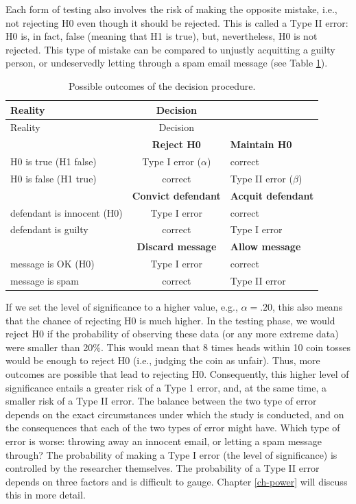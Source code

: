 \documentclass[
]{book}
\begin{document}
Each form of testing also involves the risk of making the opposite mistake, i.e., not rejecting H0 even though it should be rejected. This is called a Type II error: H0 is, in fact, false (meaning that H1 is true), but, nevertheless, H0 is not rejected. This type of mistake can be compared to unjustly acquitting a guilty person, or undeservedly letting through a spam email message (see Table \ref{tab:H0H1outcomes}).

\begin{longtable}[]{@{}lcl@{}}
\caption{\label{tab:H0H1outcomes} Possible outcomes of the decision procedure.}\tabularnewline
\toprule
Reality & Decision & \\
\midrule
\endfirsthead
\toprule
Reality & Decision & \\
\midrule
\endhead
& \textbf{Reject H0} & \textbf{Maintain H0} \\
H0 is true (H1 false) & Type I error (\(\alpha\)) & correct \\
H0 is false (H1 true) & correct & Type II error (\(\beta\)) \\
& \textbf{Convict defendant} & \textbf{Acquit defendant} \\
defendant is innocent (H0) & Type I error & correct \\
defendant is guilty & correct & Type I error \\
& \textbf{Discard message} & \textbf{Allow message} \\
message is OK (H0) & Type I error & correct \\
message is spam & correct & Type II error \\
\bottomrule
\end{longtable}

If we set the level of significance to a higher value, e.g., \(\alpha = .20\), this also means that the chance of rejecting H0 is much higher. In the testing phase, we would reject H0 if the probability of observing these data (or any more extreme data) were smaller than 20\%. This would mean that 8 times heads within 10 coin tosses would be enough to reject H0 (i.e., judging the coin as unfair). Thus, more outcomes are possible that lead to rejecting H0. Consequently, this higher level of significance entails a greater risk of a Type 1 error, and, at the same time, a smaller risk of a Type II error. The balance between the two type of error depends on the exact circumstances under which the study is conducted, and on the consequences that each of the two types of error might have. Which type of error is worse: throwing away an innocent email, or letting a spam message through? The probability of making a Type I error (the level of significance) is controlled by the researcher themselves. The probability of a Type II error depends on three factors and is difficult to gauge. Chapter \ref{ch-power} will discuss this in more detail.
\end{document}
